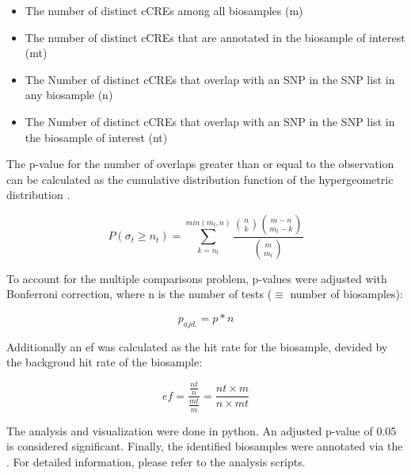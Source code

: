 \begin{itemize}
    \item The number of distinct \acp{cCRE} among all biosamples (m)
    \item The number of distinct \acp{cCRE} that are annotated in the biosample of interest (mt)
    \item The Number of distinct \acp{cCRE} that overlap with an SNP in the SNP list in any biosample (n)
    \item The Number of distinct \acp{cCRE} that overlap with an SNP in the SNP list in the biosample of interest (nt)
\end{itemize}

The p-value for the number of overlaps greater than or equal to the observation can be calculated as the cumulative distribution function of the hypergeometric distribution \cite{virtanenSciPyFundamentalAlgorithms2020}.

$$ P(\sigma_t\geq n_t) = \sum_{k=n_t}^{min(m_t, n)} \frac{\binom{n}{k}\binom{m-n}{m_t-k}}{\binom{m}{m_t}} $$

To account for the multiple comparisons problem, p-values were adjusted with Bonferroni correction, where n is the number of tests ($\equiv$ number of biosamples):

$$ p_{ajd.} = p*n$$

Additionally an \ac{ef} was calculated as the hit rate for the biosample, devided by the backgroud hit rate of the biosample:

$$ ef = \frac{\frac{nt}{n}}{\frac{mt}{m}} = \frac{nt\times m}{n\times mt}$$

The analysis and visualization were done in python. An adjusted p-value of 0.05 is considered significant. Finally, the identified biosamples were annotated via the . For detailed information, please refer to the analysis scripts.


